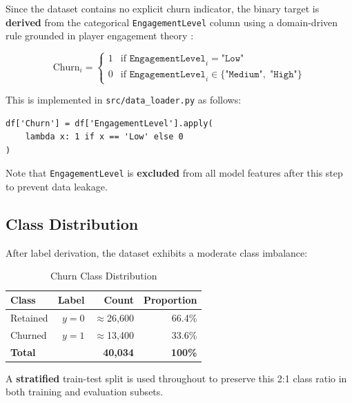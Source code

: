 \documentclass[12pt, a4paper]{article}
\begin{document}
Since the dataset contains no explicit churn indicator, the binary target
is \textbf{derived} from the categorical \texttt{EngagementLevel} column
using a domain-driven rule grounded in player engagement theory
\cite{hadiji2014}:

\begin{equation}
    \text{Churn}_i =
    \begin{cases}
        1 & \text{if } \texttt{EngagementLevel}_i = \texttt{"Low"} \\
        0 & \text{if } \texttt{EngagementLevel}_i \in \{\texttt{"Medium"},\; \texttt{"High"}\}
    \end{cases}
\end{equation}

This is implemented in \texttt{src/data\_loader.py} as follows:

\begin{lstlisting}[caption={Churn label derivation in data\_loader.py}, label={lst:churn}]
df['Churn'] = df['EngagementLevel'].apply(
    lambda x: 1 if x == 'Low' else 0
)
\end{lstlisting}

\noindent Note that \texttt{EngagementLevel} is \textbf{excluded} from all
model features after this step to prevent data leakage.

\subsection{Class Distribution}

After label derivation, the dataset exhibits a moderate class imbalance:

\begin{table}[H]
\centering
\caption{Churn Class Distribution}
\label{tab:classdist}
\renewcommand{\arraystretch}{1.25}
\begin{tabular}{l r r r}
\toprule
\textbf{Class} & \textbf{Label} & \textbf{Count} & \textbf{Proportion} \\
\midrule
Retained & $y = 0$ & $\approx$26,600 & 66.4\% \\
Churned  & $y = 1$ & $\approx$13,400 & 33.6\% \\
\midrule
\textbf{Total} & & \textbf{40,034} & \textbf{100\%} \\
\bottomrule
\end{tabular}
\end{table}

\noindent A \textbf{stratified} train-test split is used throughout to
preserve this 2:1 class ratio in both training and evaluation subsets.
\end{document}
